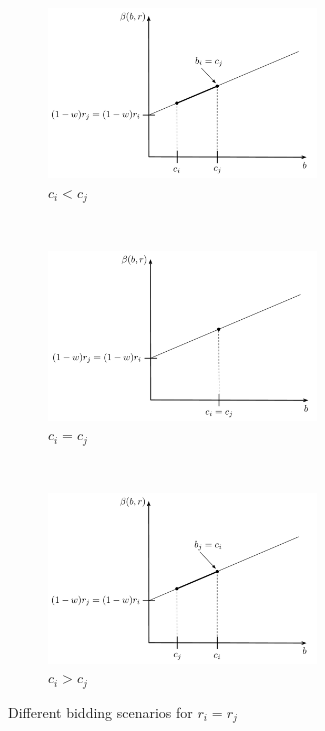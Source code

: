 \begin{figure}[p!]
	\vspace{0.5cm}
	\begin{subfigure}[b]{0.5\textwidth}
		\includegraphics[width=2.8in]{Direct/Figures/complete_N_2_c4}	  
	  \caption{$c_i<c_j$}
	  \label{fig:complete_N_2_c4_direct}
	\end{subfigure}
	\vspace{0.5cm}\\
	\begin{subfigure}[b]{0.5\textwidth}
	  \includegraphics[width=2.8in]{Direct/Figures/complete_N_2_c5}
	  \caption{$c_i=c_j$}
	  \label{fig:complete_N_2_c5_direct}
	\end{subfigure}
	\vspace{0.5cm}\\
	\begin{subfigure}[b]{0.5\textwidth}
	  \includegraphics[width=2.8in]{Direct/Figures/complete_N_2_c6}
	  \caption{$c_i > c_j$}
	  \label{fig:complete_N_2_c6_direct}
	\end{subfigure}
	\caption{Different bidding scenarios for $r_i = r_j$}
	\label{fig:complete_N_2_2_direct}
\end{figure}

